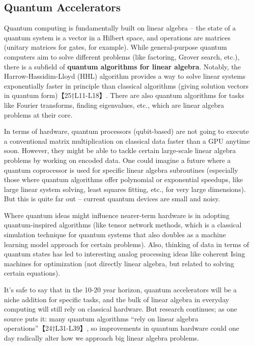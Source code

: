 \subsection{Quantum Accelerators}  
Quantum computing is fundamentally built on linear algebra – the state of a quantum system is a vector in a Hilbert space, and operations are matrices (unitary matrices for gates, for example). While general-purpose quantum computers aim to solve different problems (like factoring, Grover search, etc.), there is a subfield of \textbf{quantum algorithms for linear algebra}. Notably, the Harrow-Hassidim-Lloyd (HHL) algorithm provides a way to solve linear systems exponentially faster in principle than classical algorithms (giving solution vectors in quantum form)【25†L11-L18】. There are also quantum algorithms for tasks like Fourier transforms, finding eigenvalues, etc., which are linear algebra problems at their core.

In terms of hardware, quantum processors (qubit-based) are not going to execute a conventional matrix multiplication on classical data faster than a GPU anytime soon. However, they might be able to tackle certain large-scale linear algebra problems by working on encoded data. One could imagine a future where a quantum coprocessor is used for specific linear algebra subroutines (especially those where quantum algorithms offer polynomial or exponential speedups, like large linear system solving, least squares fitting, etc., for very large dimensions). But this is quite far out – current quantum devices are small and noisy.

Where quantum ideas might influence nearer-term hardware is in adopting quantum-inspired algorithms (like tensor network methods, which is a classical simulation technique for quantum systems that also doubles as a machine learning model approach for certain problems). Also, thinking of data in terms of quantum states has led to interesting analog processing ideas like coherent Ising machines for optimization (not directly linear algebra, but related to solving certain equations).

It’s safe to say that in the 10-20 year horizon, quantum accelerators will be a niche addition for specific tasks, and the bulk of linear algebra in everyday computing will still rely on classical hardware. But research continues; as one source puts it: many quantum algorithms “rely on linear algebra operations”【24†L31-L39】, so improvements in quantum hardware could one day radically alter how we approach big linear algebra problems.

